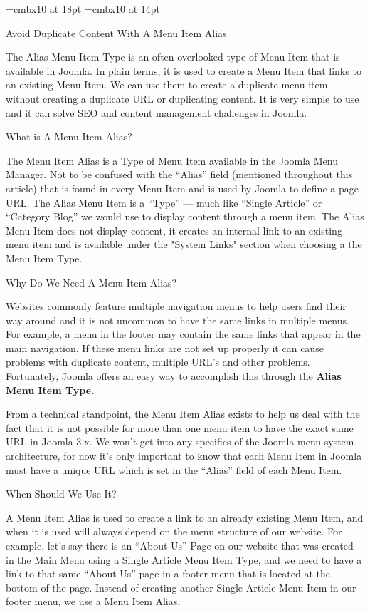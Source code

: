 \font\einbf=cmbx10 at 18pt
\font\twbf=cmbx10 at 14pt
\parindent=0pt \parskip=10pt

{\einbf Avoid Duplicate Content With A Menu Item Alias}

The Alias Menu Item Type is an often overlooked type of Menu Item that is available in Joomla. In plain terms, it is used to create a Menu Item that links to an existing Menu Item. We can use them to create a duplicate menu item without creating a duplicate URL or duplicating content. It is very simple to use and it can solve SEO and content management challenges in Joomla.

{\twbf What is A Menu Item Alias?}

The Menu Item Alias is a Type of Menu Item available in the Joomla Menu Manager. Not to be confused with the ``Alias'' field (mentioned throughout this article) that is found in every Menu Item and is used by Joomla to define a page URL. The Alias Menu Item is a ``Type'' --- much like ``Single Article'' or ``Category Blog'' we would use to display content through a menu item. The Alias Menu Item does not display content, it creates an internal link to an existing menu item and is available under the "System Links" section when choosing a the Menu Item Type.

{\twbf Why Do We Need A Menu Item Alias?}

Websites commonly feature multiple navigation menus to help users find their way around and it is not uncommon to have the same links in multiple menus. For example, a menu in the footer may contain the same links that appear in the main navigation. If these menu links are not set up properly it can cause problems with duplicate content, multiple URL's and other problems. Fortunately, Joomla offers an easy way to accomplish this through the {\bf Alias Menu Item Type.}

From a technical standpoint, the Menu Item Alias exists to help us deal with the fact that it is not possible for more than one menu item to have the exact same URL in Joomla 3.x. We won't get into any specifics of the Joomla menu system architecture, for now it's only important to know that each Menu Item in Joomla must have a unique URL which is set in the “Alias” field of each Menu Item.

{\twbf When Should We Use It?}

A Menu Item Alias is used to create a link to an already existing Menu Item, and when it is used will always depend on the menu structure of our website. For example, let's say there is an ``About Us'' Page on our website that was created in the Main Menu using a Single Article Menu Item Type, and we need to have a link to that same ``About Us'' page in a footer menu that is located at the bottom of the page. Instead of creating another Single Article Menu Item in our footer menu, we use a Menu Item Alias.

